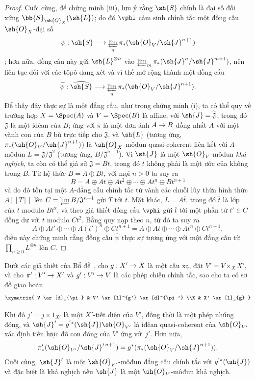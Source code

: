 \documentclass[oneside,10pt]{amsart}
\makeatletter
\renewcommand{\geq}{\geqslant}
\newcommand{\ega@arrow}[2]{\mathchoice{#1}{#2}{#2}{#2}}
\renewcommand{\to}{\ega@arrow{\longrightarrow}{\rightarrow}}
\newcommand{\oldpage}[2][]{\marginnote{\normalfont\footnotesize\textbf{#1}~|~#2}\ignorespaces}
\let\EGAOriginalLabel\label
\renewcommand{\label}[1]{\phantomsection\EGAOriginalLabel{#1}}
\makeatother
\begin{document}
\begin{proof}
Cuối cùng, để chứng minh (iii), lưu ý rằng $\sh{S}$ chính là đại số đối xứng $\bb{S}_{\sh{O}_X}(\sh{L})$;
do đó $\vphi$ cảm sinh chính tắc một đồng cấu $\sh{O}_X$-đại số
\[
  \psi:\sh{S}\longrightarrow
  \varprojlim_n\pi_*(\sh{O}_V/\sh{J}^{n+1})
\]
;
hơn nữa, đồng cấu này gửi $\sh{L}^{\otimes n}$ vào $\varprojlim_m\pi_*(\sh{J}^n/\sh{J}^{m+1})$, nên liên tục đối với các tôpô đang xét và vì thế mở rộng thành một đồng cấu
\[
  \widehat{\psi}:\widehat{\sh{S}}\longrightarrow
  \varprojlim_n\pi_*(\sh{O}_V/\sh{J}^{n+1}).
\]
Để thấy đây thực sự là một đẳng cấu, như trong chứng minh (i), ta có thể quy về trường hợp $X=\Spec(A)$ và $V=\Spec(B)$ là affine, với $\sh{J}=\widetilde{\mathfrak{J}}$, trong đó $\mathfrak{J}$ là một iđêan của $B$;
ứng với $\pi$ là một đơn ánh $A\to B$ đồng nhất $A$ với một vành con của $B$ bù trực tiếp cho $\mathfrak{J}$, và $\sh{L}$ (tương ứng, $\pi_*(\sh{O}_V/\sh{J}^{n+1})$) là $\sh{O}_X$-môđun quasi-coherent liên kết với $A$-môđun $L=\mathfrak{J}/\mathfrak{J}^2$ (tương ứng, $B/\mathfrak{J}^{n+1}$).
Vì $\sh{J}$ là một $\sh{O}_V$-môđun \emph{khả nghịch}, ta còn có thể giả sử $\mathfrak{J}=Bt$, trong đó $t$ không phải là một ước của không trong $B$.
Từ hệ thức $B=A\oplus Bt$, với mọi $n>0$ ta suy ra
\[
  B=A\oplus At\oplus At^2\oplus\cdots\oplus At^n\oplus Bt^{n+1}
\]
và do đó tồn tại một $A$-đẳng cấu chính tắc từ vành các chuỗi lũy thừa hình thức $A[[T]]$ lên $C=\varprojlim B/\mathfrak{J}^{n+1}$ gửi $T$ tới $t$.
Mặt khác, $L=A\overline{t}$, trong đó $\overline{t}$ là lớp của $t$ modulo $Bt^2$, và theo giả thiết đồng cấu $\vphi$ gửi $\overline{t}$ tới một phần tử $t'\in C$ đồng dư với $t$ modulo $Ct^2$.
Bằng quy nạp theo $n$, từ đó ta suy ra
\[
  A\oplus At'\oplus\cdots\oplus A(t')^n\oplus Ct^{n+1}
  =A\oplus At\oplus\cdots\oplus At^n\oplus Ct^{n+1},
\]
điều này chứng minh rằng đồng cấu $\widehat{\psi}$ thực sự tương ứng với một đẳng cấu từ $\prod_{n\geq0}L^{\otimes n}$ lên $C$.
\end{proof}

\begin{lemma}[8.10.2]
\label{II.8.10.2}
Dưới các giả thiết của Bổ đề~, cho $g:X'\to X$ là một cấu xạ,
\oldpage[II]{186}
đặt $V'=V\times_X X'$, và cho $\pi':V'\to X'$ và $g':V'\to V$ là các phép chiếu chính tắc, sao cho ta có sơ đồ giao hoán
\[
  \xymatrix{
    V
      \ar[d]_{\pi}
  & V'
      \ar[l]^{g'}
      \ar[d]^{\pi'}
  \\X
  & X'
      \ar[l]_{g}
  }
\]

Khi đó $j'=j\times1_{X'}$ là một $X'$-tiết diện của $V'$, đồng thời là một phép nhúng đóng, và $\sh{J}'=g^{'*}(\sh{J})\sh{O}_{V'}$ là iđêan quasi-coherent của $\sh{O}_{V'}$ xác định tiền lược đồ con đóng của $V'$ ứng với $j'$.
Hơn nữa,
\[
  \pi'_*(\sh{O}_{V'}/\sh{J}'^{\,n+1})
  =g^*(\pi_*(\sh{O}_V/\sh{J}^{n+1})).
\]
Cuối cùng, $\sh{J}'$ là một $\sh{O}_{V'}$-môđun đẳng cấu chính tắc với $g^{'*}(\sh{J})$ và đặc biệt là khả nghịch nếu $\sh{J}$ là một $\sh{O}_V$-môđun khả nghịch.
\end{lemma}
\end{document}
